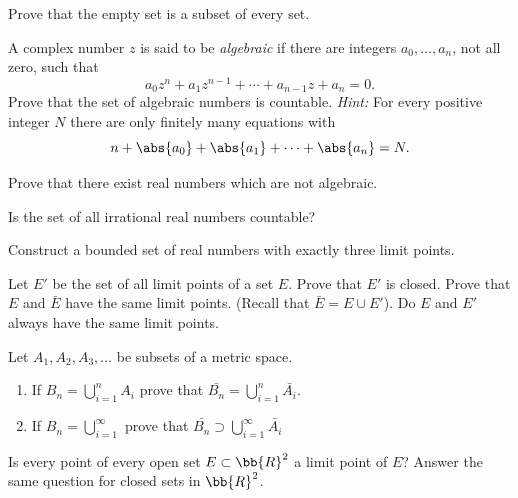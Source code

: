 \documentclass[12pt,letterpaper]{hmcpset}
\begin{document}
\begin{problem}[1.]
	Prove that the empty set is a subset of every set.
\end{problem}

\begin{problem}[2.]
	A complex number $z$ is said to be \textit{algebraic} if there are integers $a_0, \ldots, a_n$, not all zero, such that
	\[
		a_0 z^n + a_1 z^{n - 1} + \cdots + a_{n - 1}z + a_n = 0.
	\]
	Prove that the set of algebraic numbers is countable. \textit{Hint:} For every positive integer $N$ there are only finitely many equations with
	\[
		n + \abs{a_0} + \abs{a_1} + \cdots + \abs{a_n} = N.
	\]
\end{problem}

\begin{problem}[3.]
	Prove that there exist real numbers which are not algebraic.
\end{problem}

\begin{problem}[4.]
	Is the set of all irrational real numbers countable?
\end{problem}

\begin{problem}[5.]
	Construct a bounded set of real numbers with exactly three limit points.
\end{problem}

\begin{problem}[6.]
	Let $E'$ be the set of all limit points of a set $E$. Prove that $E'$ is closed. Prove that $E$ and $\bar{E}$ have the same limit points. (Recall that $\bar{E} = E \cup E'$). Do $E$ and $E'$ always have the same limit points.
\end{problem}

\begin{problem}[7.]
	Let $A_1, A_2, A_3, \ldots$ be subsets of a metric space.
	\begin{enumerate}
		\item If $B_n = \bigcup_{i = 1}^n A_i$ prove that $\bar{B_n} = \bigcup_{i = 1}^n \bar{A_i}$.
	\item If $B_n = \bigcup_{i = 1}^\infty$ prove that $\bar{B_n} \supset \bigcup_{i = 1}^\infty \bar{A_i}$
	\end{enumerate}
\end{problem}

\begin{problem}[8.]
	Is every point of every open set $E \subset \bb{R}^2$ a limit point of $E$? Answer the same question for closed sets in $\bb{R}^2$.
\end{problem}
\end{document}
